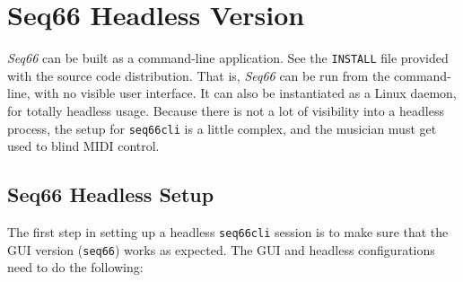 %
%
%

\section{Seq66 Headless Version}
\label{sec:headless}

   \textsl{Seq66} can be built as a command-line application.
   See the \texttt{INSTALL} file provided with the source code distribution.
   That is, \textsl{Seq66}
   can be run from the command-line, with no visible user interface.
   It can also be instantiated as a Linux daemon, for totally headless usage.
   Because there is not a lot of visibility into a headless process, the
   setup for \texttt{seq66cli} is a little complex, and the musician must get
   used to blind MIDI control.

\subsection{Seq66 Headless Setup}
\label{subsec:headless_setup}

   The first step in setting up a headless \texttt{seq66cli} session is
   to make sure that the GUI version (\texttt{seq66}) works as expected.
   The GUI and headless configurations need to do the following:
   
